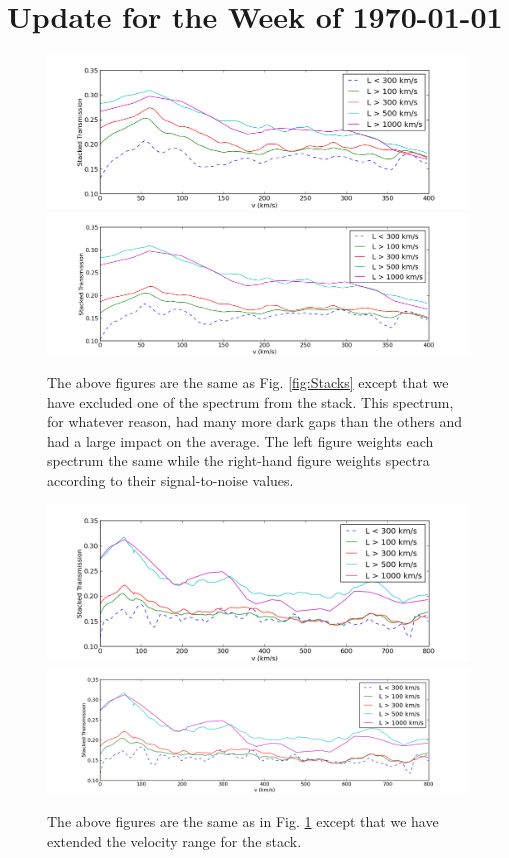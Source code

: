 \documentclass[11pt]{article}
\begin{document}
\section*{Update for the Week of \today}

\begin{figure}[h]
  \centering
  \includegraphics[width=18cm]{Stacks_Skip2ndSpectrum_NoWeighting.png}
  \includegraphics[width=18cm]{Stacks_Skip2ndSpectrum.png}
  \caption{The above figures are the same as Fig. \ref{fig:Stacks} except that we have excluded one of the spectrum from the stack. This spectrum, for whatever reason, had many more dark gaps than the others and had a large impact on the average. The left figure weights each spectrum the same while the right-hand figure weights spectra according to their signal-to-noise values. }
  \label{fig:SkipSome}
\end{figure}


\begin{figure}[h]
  \centering
  \includegraphics[width=18cm]{Stacks_Extended_NoWeighting.png}
  \includegraphics[width=18cm]{Stacks_Extended.png}
  \caption{The above figures are the same as in Fig. \ref{fig:SkipSome} except that we have extended the velocity range for the stack.}
  \label{fig:todo}
\end{figure}
\end{document}
